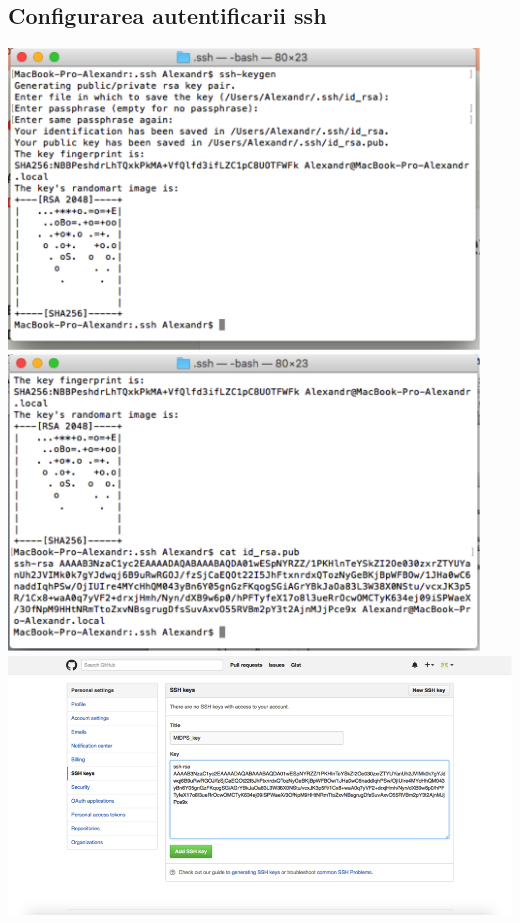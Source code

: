 \documentclass[12pt]{article}
\begin{document}
\subsection{Configurarea autentificarii ssh}
\includegraphics[width=12.5cm]{images/1}\\
\includegraphics[width=12.5cm]{images/2}\\
\includegraphics[width=15.5cm]{images/3}\\
\end{document}
